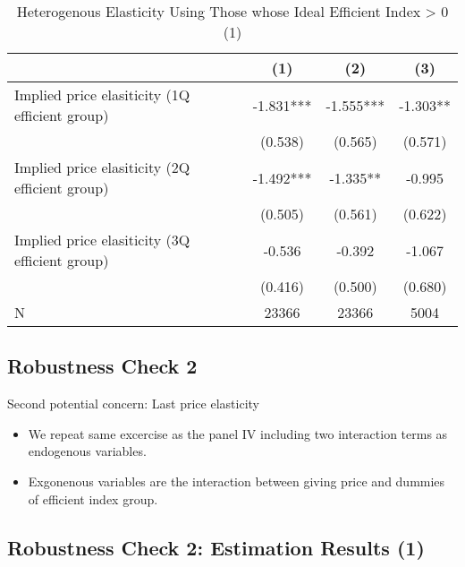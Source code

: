 \documentclass[ review  , 3p ]{elsarticle}
\providecommand{\tightlist}{%
  \setlength{\itemsep}{0pt}\setlength{\parskip}{0pt}}
\begin{document}
  \begin{table}
  
  \caption{\label{tab:kableSubsetHeteroElasticitySlide2}Heterogenous Elasticity Using Those whose Ideal Efficient Index > 0 (1)}
  \centering
  \fontsize{8}{10}\selectfont
  \begin{tabular}[t]{lccc}
  \toprule
   & (1) & (2) & (3)\\
  \midrule
  Implied price elasiticity (1Q efficient group) & -1.831*** & -1.555*** & -1.303**\\
   & (0.538) & (0.565) & (0.571)\\
  Implied price elasiticity (2Q efficient group) & -1.492*** & -1.335** & -0.995\\
   & (0.505) & (0.561) & (0.622)\\
  Implied price elasiticity (3Q efficient group) & -0.536 & -0.392 & -1.067\\
   & (0.416) & (0.500) & (0.680)\\
  N & 23366 & 23366 & 5004\\
  \bottomrule
  \end{tabular}
  \end{table}
  
  \hypertarget{robustness-check-2}{%
  \subsection{Robustness Check 2}\label{robustness-check-2}}
  
  Second potential concern: Last price elasticity
  
  \begin{itemize}
  \tightlist
  \item
    We repeat same excercise as the panel IV including two interaction terms as endogenous variables.
  \item
    Exgonenous variables are the interaction between giving price and dummies of efficient index group.
  \end{itemize}
  
  \hypertarget{robustness-check-2-estimation-results-1}{%
  \subsection{Robustness Check 2: Estimation Results (1)}\label{robustness-check-2-estimation-results-1}}
  
\end{document}
